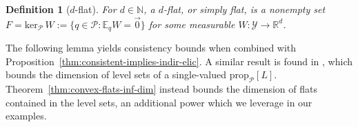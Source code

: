 \documentclass{article} %
\newcommand{\Comments}{0}
\newcommand{\mytodo}[2]{\ifnum\Comments=1%
	\todo[linecolor=#1!80!black,backgroundcolor=#1,bordercolor=#1!80!black]{#2}\fi}
\newcommand{\raft}[1]{\mytodo{green!20!white}{RF: #1}}
\newcommand{\jessiet}[1]{\mytodo{teal!20!white}{JF: #1}}
\newcommand{\reals}{\mathbb{R}}
\newcommand{\simplex}{\Delta_\Y}
\newcommand{\prop}[2][\mathcal{P}]{\mathrm{prop}_{#1}[#2]}
\newcommand{\spn}{\mathrm{span}}
\newcommand{\zeros}[1]{\mathrm{ker}_\P\,#1}
\newcommand{\affhull}{\mathrm{affhull}}
\newcommand{\E}{\mathbb{E}}
\renewcommand{\P}{\mathcal{P}}
\newcommand{\Y}{\mathcal{Y}}
\newtheorem{definition}{Definition}
\begin{document}

\begin{definition}[$d$-flat]\label{def:flat-general}
  For $d\in\mathbb N$, a \emph{$d$-flat}, or simply \emph{flat}, is a nonempty set $F = \zeros{W} := \{q \in \P : \E_q W = \vec 0\}$ for some measurable $W:\Y \to \reals^d$.
\end{definition}

The following lemma yields consistency bounds when combined with Proposition~\ref{thm:consistent-implies-indir-elic}. %
A similar result is found in \citet[Theorem 9]{agarwal2015consistent}, which bounds the dimension of level sets of a single-valued $\prop{L}$.
Theorem~\ref{thm:convex-flats-inf-dim} instead bounds the dimension of flats contained in the level sets, an additional power which we leverage in our examples.
\end{document}
